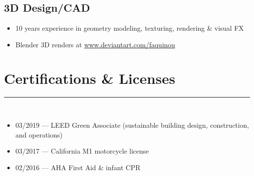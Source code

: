 \documentclass[10pt]{article}
\begin{document}
\subsection*{3D Design/CAD}
\begin{itemize}
    \item 10 years experience in geometry modeling, texturing, rendering \& visual FX
    \item Blender 3D renders at \url{www.deviantart.com/faquinou}
\end{itemize}

\section*{Certifications \& Licenses}
\rule{\linewidth}{1pt}\\[0.2cm]
\begin{itemize}
	\item 03/2019 --- LEED Green Associate (sustainable building design, construction, and operations)
    \item 03/2017 --- California M1 motorcycle license
    \item 02/2016 --- AHA First Aid \& infant CPR
\end{itemize}
\end{document}
